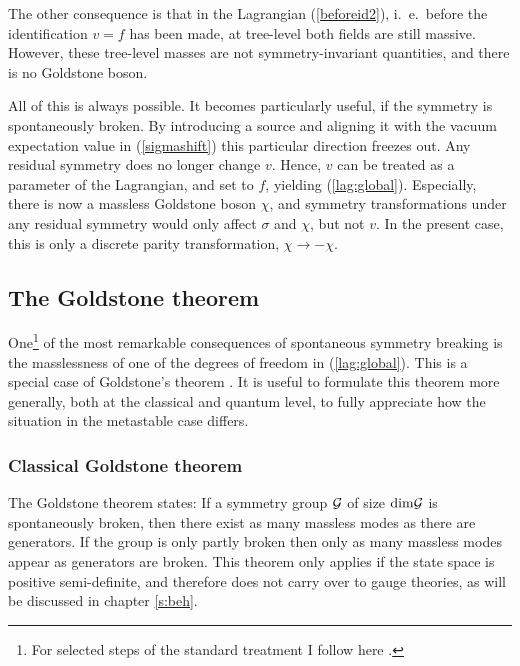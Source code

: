 \documentclass[final,twoside,12pt]{article}
\newcommand*{\pref}[1]{(\ref{#1})}
\newcommand*{\1}{1\!\!\!\bot}
\begin{document}
The other consequence is that in the Lagrangian \pref{beforeid2}, i.\ e.\ before the identification $v=f$ has been made, at tree-level both fields are still massive. However, these tree-level masses are not symmetry-invariant quantities, and there is no Goldstone boson.

All of this is always possible. It becomes particularly useful, if the symmetry is spontaneously broken. By introducing a source and aligning it with the vacuum expectation value in \pref{sigmashift} this particular direction freezes out. Any residual symmetry does no longer change $v$. Hence, $v$ can be treated as a parameter of the Lagrangian, and set to $f$, yielding \pref{lag:global}. Especially, there is now a massless Goldstone boson $\chi$, and symmetry transformations under any residual symmetry would only affect $\sigma$ and $\chi$, but not $v$. In the present case, this is only a discrete parity transformation, $\chi\to-\chi$.

\subsection{The Goldstone theorem}\label{ss:goldstone}

One\footnote{For selected steps of the standard treatment I follow here \cite{Bohm:2001yx}.} of the most remarkable consequences of spontaneous symmetry breaking is the masslessness of one of the degrees of freedom in \pref{lag:global}. This is a special case of Goldstone's theorem \cite{Goldstone:1961eq,Bohm:2001yx,Strocchi:2015uaa}. It is useful to formulate this theorem more generally, both at the classical and quantum level, to fully appreciate how the situation in the metastable case differs.

\subsubsection{Classical Goldstone theorem}\label{sss:cgoldstone}

The Goldstone theorem \cite{Goldstone:1961eq} states: If a symmetry group ${\cal G}$ of size $\mathrm{dim}{\cal G}$ is spontaneously broken, then there exist as many massless modes as there are generators. If the group is only partly broken then only as many massless modes appear as generators are broken. This theorem only applies if the state space is positive semi-definite, and therefore does not carry over to gauge theories, as will be discussed in chapter \ref{s:beh}.
\end{document}
